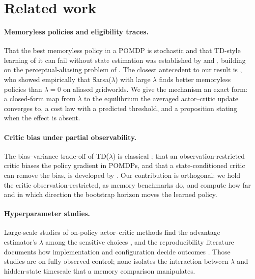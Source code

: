 
\section{Related work}
\label{sec:related}

\paragraph{Memoryless policies and eligibility traces.} That the best
memoryless policy in a POMDP is stochastic and that TD-style learning of it
can fail without state estimation was established by
\citet{singh1994learning} and \citet{jaakkola1995reinforcement}, building on
the perceptual-aliasing problem of \citet{whitehead1991learning}. The closest
antecedent to our result is \citet{loch1998using}, who showed empirically that
Sarsa($\lambda$) with large $\lambda$ finds better memoryless policies than
$\lambda=0$ on aliased gridworlds. We give the mechanism an exact form: a
closed-form map from $\lambda$ to the equilibrium the averaged actor--critic
update converges to, a cost law with a predicted threshold, and a proposition
stating when the effect is absent.

\paragraph{Critic bias under partial observability.} The bias--variance
trade-off of TD($\lambda$) is classical \citep{kearns2000bias}; that an
observation-restricted critic biases the policy gradient in POMDPs, and that a
state-conditioned critic can remove the bias, is developed by
\citet{baisero2022unbiased}. Our contribution is orthogonal: we hold the critic
observation-restricted, as memory benchmarks do, and compute how far and in
which direction the bootstrap horizon moves the learned policy.

\paragraph{Hyperparameter studies.} Large-scale studies of on-policy
actor--critic methods find the advantage estimator's $\lambda$ among the
sensitive choices \citep{andrychowicz2021what}, and the reproducibility
literature documents how implementation and configuration decide outcomes
\citep{henderson2018deep,engstrom2020implementation}. Those studies are on
fully observed control; none isolates the interaction between $\lambda$ and
hidden-state timescale that a memory comparison manipulates.

